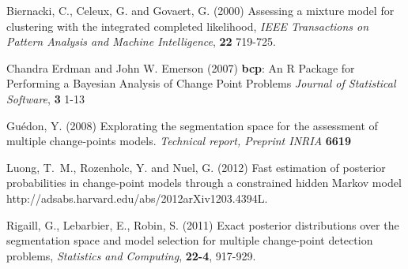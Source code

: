 \documentclass{bioinfo}
\begin{document}
\begin{methods}
\begin{thebibliography}{}
 Biernacki, C., Celeux, G. and Govaert, G. (2000) Assessing a mixture model for clustering with the integrated completed likelihood, {\it{IEEE} Transactions on Pattern Analysis and Machine Intelligence}, {\bf 22} 719-725.

   Chandra Erdman and John W. Emerson (2007) {\bf{bcp}}: An {R} Package for Performing a Bayesian Analysis
      of Change Point Problems {\it Journal of Statistical Software}, {\bf 3} 1-13

 Guédon, Y. (2008) Explorating the segmentation space for the assessment of multiple change-points models. {\it Technical report, Preprint INRIA} {\bf 6619}

 Luong, T.~M., Rozenholc, Y. and Nuel, G. (2012) Fast estimation of posterior probabilities in change-point models through a constrained hidden Markov model {http://adsabs.harvard.edu/abs/2012arXiv1203.4394L}.

 Rigaill, G., Lebarbier, E., Robin, S. (2011) Exact posterior distributions over the segmentation space and model selection for multiple change-point detection problems, {\it Statistics and Computing}, {\bf 22-4}, 917-929.

\end{thebibliography}
\end{methods}
\end{document}
